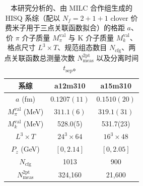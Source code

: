 \begin{table}[!htbp]
\centering
\begin{tabular}{|c|c|c|}
\hline
  系综 &  a12m310 & a15m310 \\
\hline
  $a$ (fm)   & $0.1207(11)$  & $0.1510(20)$ \\
\hline
  $M_\pi^\text{val}$ (MeV)  & $311.1(6)$ & $319.1(31)$\\
\hline
  $M_{k}^\text{val}$ (MeV)  & 528.0(5) &  531.7(23)  \\
\hline
  $L^3\times T$   & $24^3\times 64$ & $16^3\times 48$ \\
\hline
  $P_z$ (GeV)   &  $[0,2.14]$ &  $[0,2.05]$ \\
\hline
  $N_\text{cfg}$  & 1013 & 900 \\
\hline
  $N_\text{meas}^\text{2pt}$   & 324,160 & 21,600 \\
\hline
\end{tabular}
\caption{
本研究分析的、由 MILC 合作组生成的 HISQ 系综（配以 $N_f=2+1+1$ clover 价费米子用于三点关联函数拟合）的格距 $a$、价 $\pi$ 介子质量 $M_\pi^\text{val}$ 与 K 介子质量 $M_{k}^\text{val}$、格点尺寸 $L^3\times T$、规范组态数目 $N_\text{cfg}$、两点关联函数总测量次数 $N_\text{meas}^\text{2pt}$ 以及分离时间 $t_\text{sep}$。
}\label{table-data}
\end{table}




